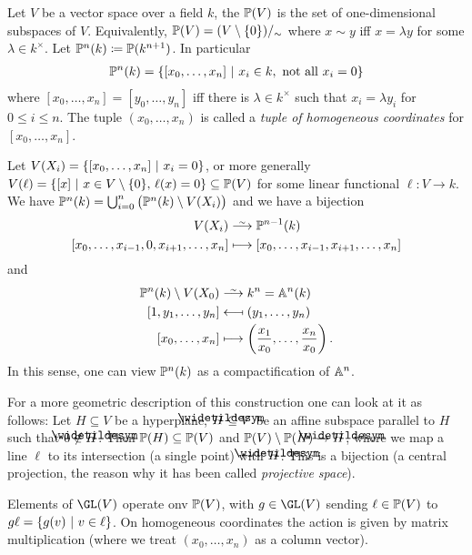 \documentclass[a4paper,parskip=half,numbers=enddot, DIV=12, headheight=30pt]{scrreprt}
\begin{document}
\begin{defi}
    Let $V$ be a vector space over a field $k$, the  $\mathbb{P}(V)$ is the set of one-dimensional subspaces of $V$. Equivalently, $\mathbb{P}(V)=(V\setminus\{0\})/_\sim$ where $x\sim y$ iff $x=\lambda y$ for some $\lambda\in k^\times$. Let $\mathbb{P}^n(k) \coloneqq \mathbb{P}(k^{n+1})$. In particular
    \begin{align*}
        \mathbb{P}^n(k) = \left\{[x_0,\ldots, x_n]\ \middle|\  x_i\in k, \text{ not all } x_i=0\right\}
    \end{align*}
    where $[x_0,\ldots, x_n] = [y_0,\ldots,y_n]$ iff there is $\lambda\in k^\times$ such that $x_i=\lambda y_i$ for $0\leq i\leq n$. The tuple $(x_0,\ldots, x_n)$ is called a \emph{tuple of homogeneous coordinates} for $[x_0,\ldots,x_n]$. 
    
    Let $V(X_i) = \left\{[x_0,\ldots, x_n]\ \middle|\  x_i=0 \right\}$, or more generally $V(\ell) = \left\{ [x] \ \middle|\  x\in V\setminus\{0\}\text{, }\ell(x) = 0\right\}\subseteq \mathbb{P}(V)$ for some linear functional $\ell\colon V\to k$. We have $\mathbb{P}^n(k) = \bigcup_{i=0}^n \big(\mathbb{P}^n(k) \setminus V(X_i)\big)$ and we have a bijection
    \begin{align*}
        V(X_i) &\isomorphism \IP^{n-1} (k)\\
        [x_0,\ldots, x_{i-1},0,x_{i+1}, \ldots, x_n] &\longmapsto [x_0,\ldots, x_{i-1},x_{i+1}, \ldots, x_n]
    \end{align*}
    and 
    \begin{align*}
        \IP^n(k)\setminus V(X_0) &\isomorphism k^n = \IA^n(k)\\
        [1,y_1,\ldots, y_n] &\longmapsfrom (y_1,\ldots, y_n)\\
        [x_0,\ldots, x_n] &\longmapsto \left(\frac{x_1}{x_0}, \ldots, \frac{x_n}{x_0}\right).
    \end{align*}
    In this sense, one can view $\mathbb{P}^n(k)$ as a compactification of $\mathbb{A}^n$. 
    
    For a more geometric description of this construction one can look at it as follows: Let $H\subseteq V$ be a hyperplane, $\snake H\subseteq V$ be an affine subspace parallel to $H$ such that $0\not\in \snake H$. Then $\mathbb{P}(H) \subseteq \mathbb{P}(V)$ and $\IP(V)\setminus \IP(H) \to \snake H$, where we map a line $\ell$ to its intersection (a single point) with $\snake H$. This is a bijection (a central projection, the reason why it has been called \emph{projective space}).
    
    Elements of $\GL(V)$ operate onv $\mathbb{P}(V)$, with $g\in \GL(V)$ sending $\ell\in \mathbb{P}(V)$ to $g\ell = \left\{g(v)\ \middle|\  v\in \ell\right\}$. On homogeneous coordinates the action is given by matrix multiplication (where we treat $(x_0,\ldots,x_n)$ as a column vector). 
\end{defi}
\end{document}
